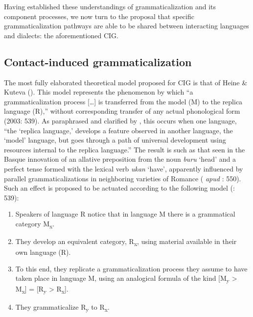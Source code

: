\documentclass[output=paper]{langsci/langscibook}
\begin{document}
Having established these understandings of grammaticalization and its component processes, we now turn to the proposal that specific grammaticalization pathways are able to be shared between interacting languages and dialects: the aforementioned CIG.

\subsection{Contact-induced grammaticalization}\label{sec:contgram}


The most fully elaborated theoretical model proposed for CIG is that of Heine \& Kuteva (\citeyear{HeineKuteva2003,HeineKuteva2005}). This model represents the phenomenon by which “a grammaticalization process […] is transferred from the model (M) to the replica language (R),” without corresponding transfer of any actual phonological form (2003: 539). As paraphrased and clarified by \citet[215]{Law2014}, this occurs when one language, “the ‘replica language,’ develops a feature observed in another language, the ‘model’ language, but goes through a path of universal development using resources internal to the replica language.” The result is such as that seen in the Basque innovation of an allative preposition from the noun \textit{buru} ‘head’ and a perfect tense formed with the lexical verb \textit{ukan} ‘have’, apparently influenced by parallel grammaticalizations in neighboring varieties of Romance (\citealt{Haase1992} \textit{apud} \citealt{HeineKuteva2003}: 550). Such an effect is proposed to be actuated according to the following model (\citealt{HeineKuteva2003}: 539):

\begin{enumerate}
\item
Speakers of language R notice that in language M there is a grammatical category M\textsubscript{x}.
\item
They develop an equivalent category, R\textsubscript{x}, using material available in their own language (R).
\item
To this end, they replicate a grammaticalization process they assume to have taken place in language M, using an analogical formula of the kind [M\textsubscript{y} > M\textsubscript{x}] = [R\textsubscript{y} > R\textsubscript{x}].
\item
They grammaticalize R\textsubscript{y} to R\textsubscript{x}. 
\end{enumerate} 
\end{document}
